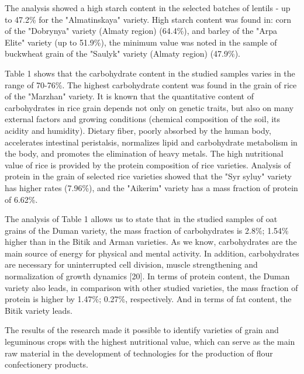 \begin{multicols}{2}
The analysis showed a high starch content in the selected batches of
lentils - up to 47.2\% for the "Almatinskaya" variety. High starch
content was found in: corn of the "Dobrynya" variety (Almaty region)
(64.4\%), and barley of the "Arpa Elite" variety (up to 51.9\%), the
minimum value was noted in the sample of buckwheat grain of the "Saulyk"
variety (Almaty region) (47.9\%).

Table 1 shows that the carbohydrate content in the studied samples
varies in the range of 70-76\%. The highest carbohydrate content was
found in the grain of rice of the "Marzhan" variety. It is known that
the quantitative content of carbohydrates in rice grain depends not only
on genetic traits, but also on many external factors and growing
conditions (chemical composition of the soil, its acidity and humidity).
Dietary fiber, poorly absorbed by the human body, accelerates intestinal
peristalsis, normalizes lipid and carbohydrate metabolism in the body,
and promotes the elimination of heavy metals. The high nutritional value
of rice is provided by the protein composition of rice varieties.
Analysis of protein in the grain of selected rice varieties showed that
the "Syr syluy" variety has higher rates (7.96\%), and the "Aikerim"
variety has a mass fraction of protein of 6.62\%.

The analysis of Table 1 allows us to state that in the studied samples
of oat grains of the Duman variety, the mass fraction of carbohydrates
is 2.8\%; 1.54\% higher than in the Bitik and Arman varieties. As we
know, carbohydrates are the main source of energy for physical and
mental activity. In addition, carbohydrates are necessary for
uninterrupted cell division, muscle strengthening and normalization of
growth dynamics {[}20{]}. In terms of protein content, the Duman variety
also leads, in comparison with other studied varieties, the mass
fraction of protein is higher by 1.47\%; 0.27\%, respectively. And in
terms of fat content, the Bitik variety leads.

The results of the research made it possible to identify varieties of
grain and leguminous crops with the highest nutritional value, which can
serve as the main raw material in the development of technologies for
the production of flour confectionery products.
\end{multicols}

